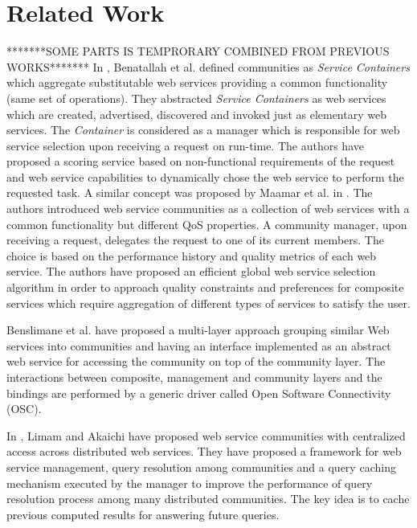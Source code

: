 \documentclass[10pt,journal,cspaper,compsoc]{IEEEtran}
\begin{document}
\section{Related Work}\label{s:related_work}

*******SOME PARTS IS TEMPRORARY COMBINED FROM PREVIOUS WORKS*******
In \cite{DBLP:journals/internet/BenatallahSD03}, Benatallah et al.
defined communities as \emph{Service Containers} which aggregate
substitutable web services providing a common functionality (same
set of operations). They abstracted \emph{Service Containers} as
web services which are created, advertised, discovered and invoked
just as elementary web services. The \emph{Container} is
considered as a manager which is responsible for web service
selection upon receiving a request on run-time. The authors have
proposed a scoring service based on non-functional requirements of
the request and web service capabilities to dynamically chose the
web service to perform the requested task. A similar concept was
proposed by Maamar et al. in
\cite{DBLP:journals/ijebr/MaamarSTBB09}. The authors introduced
web service communities as a collection of web services with a
common functionality but different QoS properties. A community
manager, upon receiving a request, delegates the request to one of
its current members. The choice is based on the performance
history and quality metrics of each web service. The authors have
proposed an efficient global web service selection algorithm in
order to approach quality constraints and preferences for
composite services which require aggregation of different types of
services to satisfy the user.

Benslimane et al. \cite{Liris-2770} have proposed a multi-layer
approach grouping similar Web services into communities and having
an interface implemented as an abstract web service for accessing
the community on top of the community layer. The interactions
between composite, management and community layers and the
bindings are performed by a generic driver called Open Software
Connectivity (OSC).

In \cite{managing-hela-jalel}, Limam and Akaichi have proposed web
service communities with centralized access across distributed web
services. They have proposed a framework for web service
management, query resolution among communities and a query caching
mechanism executed by the manager to improve the performance of
query resolution process among many distributed communities. The
key idea is to cache previous computed results for answering
future queries.
\end{document}
